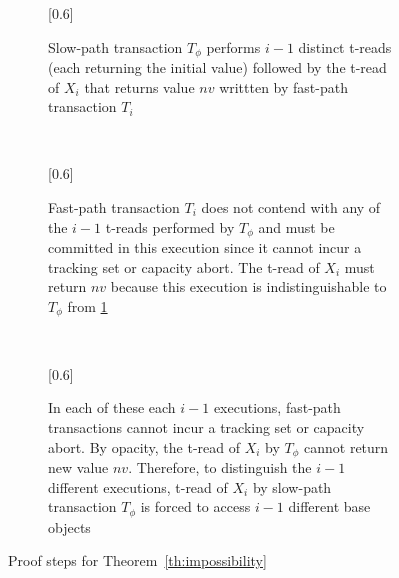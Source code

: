\begin{figure*}[!t]
\begin{center}
	\begin{subfigure}{\linewidth}{\scalebox{0.6}[0.6]{}}
	\caption{Slow-path transaction $T_{\phi}$ performs $i-1$ distinct t-reads (each returning the initial value) followed by the t-read of $X_i$ that returns value $nv$ 
	writtten by fast-path transaction $T_i$}\label{sfig:inv-1}
	\end{subfigure}
        \\
        \vspace{2mm}
	\begin{subfigure}{\linewidth}{\scalebox{0.6}[0.6]{}}
	\caption{Fast-path transaction $T_i$ does not contend with any of the $i-1$ t-reads performed by $T_{\phi}$ and must be committed in this execution since it cannot incur a tracking set or capacity abort.
	The t-read of $X_i$ must return $nv$ because this execution is indistinguishable to $T_{\phi}$ from \ref{sfig:inv-1}}
	\label{sfig:inv-2} 
	\end{subfigure}
	\\
	\vspace{2mm}
	\begin{subfigure}{\linewidth}{\scalebox{0.6}[0.6]{}}
	 \caption{In each of these each $i-1$ executions, fast-path transactions cannot incur a tracking set or capacity abort. By opacity, the t-read of $X_i$ by $T_{\phi}$ cannot return new value $nv$.
	Therefore, to distinguish the $i-1$ different executions, t-read of $X_i$ by slow-path transaction $T_{\phi}$ is forced
	to access $i-1$ different base objects}
	\label{sfig:inv-3}
	\end{subfigure}
	\caption{Proof steps for Theorem~\ref{th:impossibility}
        \label{fig:indis}} 
\end{center}
\end{figure*}
